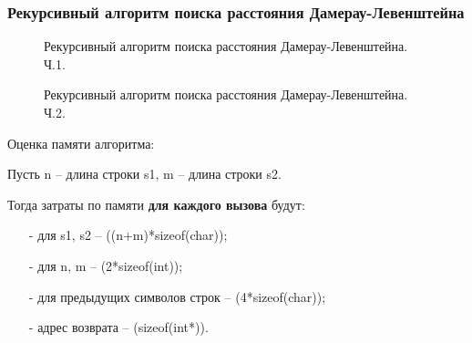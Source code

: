 \subsubsection{Рекурсивный алгоритм поиска расстояния \newline Дамерау-Левенштейна}
\begin{figure}[!h]
	\centering
	\captionsetup{justification=centering}
	
	\caption{Рекурсивный алгоритм поиска расстояния Дамерау-Левенштейна. Ч.1.}
	\label{fig:d31}
\end{figure}
\begin{figure}[h]
	\centering
	\captionsetup{justification=centering}
	
	\caption{Рекурсивный алгоритм поиска расстояния Дамерау-Левенштейна. Ч.2.}
	\label{fig:d32}
\end{figure}
\pagebreak
Оценка памяти алгоритма:\par
Пусть n -- длина строки s1, m -- длина строки s2.\par
Тогда затраты по памяти \textbf{для каждого вызова} будут:\par
\begin{itemize}
	\item[-] для s1, s2 -- ((n+m)*sizeof(char));
	\item[-] для n, m -- (2*sizeof(int));
	\item[-] для предыдущих символов строк -- (4*sizeof(char));
	\item[-] адрес возврата -- (sizeof(int*)).
\end{itemize}
\pagebreak

